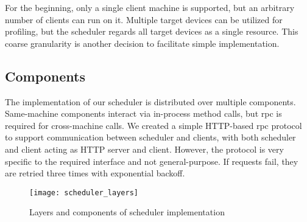 For the beginning, only a single client machine is supported, but an arbitrary number of clients can run on it. Multiple target devices can be utilized for profiling, but the scheduler regards all target devices as a single resource. This coarse granularity is another decision to facilitate simple implementation.

\subsection{Components}
The implementation of our scheduler is distributed over multiple components. Same-machine components interact via in-process method calls, but \gls{rpc} is required for cross-machine calls. We created a simple HTTP-based \gls{rpc} protocol to support communication between scheduler and clients, with both scheduler and client acting as HTTP server and client. However, the protocol is very specific to the required interface and not general-purpose. If requests fail, they are retried three times with exponential backoff.

\begin{figure}[h]
	\centering
	\texttt{[image: scheduler\_layers]}%
	\caption{Layers and components of scheduler implementation}
	\label{fig:scheduler-layers}
\end{figure}

